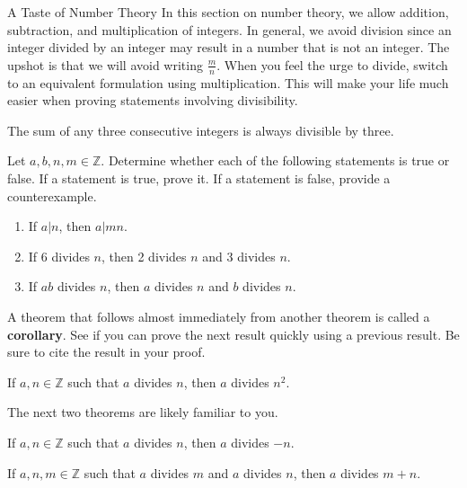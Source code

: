 \begin{section}{A Taste of Number Theory}
In this section on number theory, we allow addition, subtraction, and multiplication of integers.  In general, we avoid division since an integer divided by an integer may result in a number that is not an integer. The upshot is that we will avoid writing $\frac{m}{n}$.  When you feel the urge to divide, switch to an equivalent formulation using multiplication. This will make your life much easier when proving statements involving divisibility.

\begin{theorem}\label{thm:sum of three consecutive integers}
The sum of any three consecutive integers is always divisible by three.
\end{theorem}

\begin{problem}\label{prob:divisibility examples}
Let $a, b,n, m\in\mathbb{Z}$. Determine whether each of the following statements is true or false.  If a statement is true, prove it. If a statement is false, provide a counterexample.
\begin{enumerate}[label=\textrm{(\alph*)}]
\item\label{prob:first divisibility example} If $a|n$, then $a|mn$.
\item If 6 divides $n$, then 2 divides $n$ and 3 divides $n$.
\item If $ab$ divides $n$, then $a$ divides $n$ and $b$ divides $n$.
\end{enumerate}
\end{problem}

A theorem that follows almost immediately from another theorem is called a \textbf{corollary}.  See if you can prove the next result quickly using a previous result.  Be sure to cite the result in your proof.

\begin{corollary}\label{cor:a divs n implies a divs n^2}
If $a,n\in\mathbb{Z}$ such that $a$ divides $n$, then $a$ divides $n^2$.
\end{corollary}

The next two theorems are likely familiar to you.

\begin{theorem}\label{thm:divides negative}
If $a,n\in\mathbb{Z}$ such that $a$ divides $n$, then $a$ divides $-n$. 
\end{theorem}

\begin{theorem}\label{thm:divides sum}
If $a,n,m\in\mathbb{Z}$ such that $a$ divides $m$ and $a$ divides $n$, then $a$ divides $m+n$. 
\end{theorem}


\end{section}
